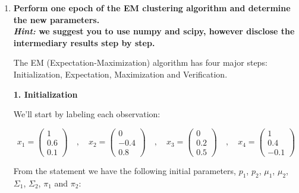 \documentclass[12pt]{article}
\begin{document}
\vskip 0.2cm
\begin{enumerate}[leftmargin=\labelsep]
    \item \textbf{Perform one epoch of the EM clustering algorithm and determine the new parameters.}\\
          \textbf{\textit{Hint:} we suggest you to use numpy and scipy, however disclose the intermediary results step by step.}

          \vskip 0.3cm
          The EM (Expectation-Maximization) algorithm has four major steps: Initialization, Expectation, Maximization and Verification.

          \vskip 0.2cm
          {
          \color{stepscolor}
          \begin{large}\textbf{1. Initialization}\end{large}
          }
          \vskip 0.1cm

          We'll start by labeling each observation:

          $$
              x_1 = \begin{pmatrix} 1 \\ 0.6 \\ 0.1 \end{pmatrix}
              \quad,\quad
              x_2 = \begin{pmatrix} 0 \\ -0.4 \\ 0.8 \end{pmatrix}
              \quad,\quad
              x_3 = \begin{pmatrix} 0 \\ 0.2 \\ 0.5 \end{pmatrix}
              \quad,\quad
              x_4 = \begin{pmatrix} 1 \\ 0.4 \\ -0.1 \end{pmatrix}
          $$

          From the statement we have the following initial parameters, $p_1$, $p_2$, $\mu_1$, $\mu_2$, $\Sigma_1$,
          $\Sigma_2$, $\pi_1$ and $\pi_2$:


\end{enumerate}
\end{document}
